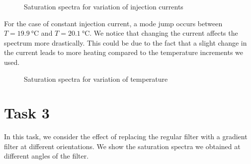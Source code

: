 \documentclass{article}
\begin{document}
\begin{figure}[H]
    \centering
    \caption{Saturation spectra for variation of injection currents}
    \label{fig:subfigures}
\end{figure}

For the case of constant injection current, a mode jump occurs between $T = \SI{19.9}{\celsius}$ and $T = \SI{20.1}{\celsius}$. We notice that changing the current affects the spectrum more drastically. This could be due to the fact that a slight change in the current leads to more heating compared to the temperature increments we used. 




\begin{figure}[H]
    \centering
    \caption{Saturation spectra for variation of temperature}
    \label{fig:subfigures}
\end{figure}

\section{Task 3}
In this task, we consider the effect of replacing the regular filter with a gradient filter at different orientations. We show the saturation spectra we obtained at different angles of the filter. 
\end{document}
